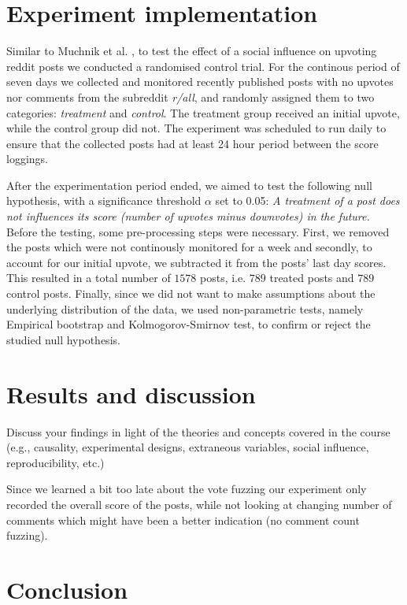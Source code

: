 \documentclass[fleqn,12pt]{article}
\begin{document}
\section{Experiment implementation}
Similar to Muchnik et al. \cite{muchnik}, to test the effect of a social
influence on upvoting reddit posts we conducted a randomised control trial.
For the continous period of seven days we collected and monitored recently published posts with no upvotes 
nor comments from the subreddit \textit{r/all}, and randomly assigned them 
to two categories: \textit{treatment} and \textit{control}.
The treatment group received an initial upvote, while the control group did not. 
The experiment was scheduled to run daily to ensure that the collected posts
had at least 24 hour period between the score loggings.

After the experimentation period ended, we aimed to test the following null hypothesis, with a significance
threshold $\alpha$ set to 0.05:
\textit{A treatment of a post does not influences its score (number of upvotes minus downvotes) in the future.}
Before the testing, some pre-processing steps were necessary. 
First, we removed the posts which were not continously monitored for a week and secondly,
to account for our initial upvote, we subtracted it from the posts' last day scores.
This resulted in a total number of $1578$ posts, i.e. $789$ treated posts and $789$ control posts. 
Finally, since we did not want to make assumptions about the underlying 
distribution of the data, we used non-parametric tests, namely Empirical bootstrap and Kolmogorov-Smirnov test, to
confirm or reject the studied null hypothesis.


\section{Results and discussion}

Discuss your findings in light of the theories and concepts covered in the course (e.g., causality, experimental designs,
extraneous variables, social influence, reproducibility, etc.)

Since we learned a bit too late about the vote fuzzing our experiment only recorded the overall score of the posts, while not looking at changing number of comments
which might have been a better indication (no comment count fuzzing).
\section{Conclusion}


 \newpage 


\end{document}
